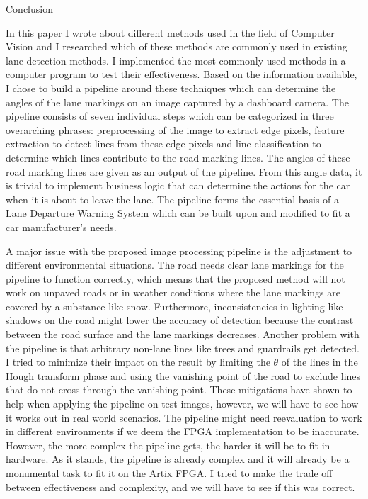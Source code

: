 \documentclass{matthijs}
\begin{document}
	\begin{hoofdstuk}{Conclusion}

		In this paper I wrote about different methods used in the field of Computer Vision and I researched which of these methods are commonly used in existing lane detection methods.
		I implemented the most commonly used methods in a computer program to test their effectiveness.
		Based on the information available, I chose to build a pipeline around these techniques which can determine the angles of the lane markings on an image captured by a dashboard camera.
		The pipeline consists of seven individual steps which can be categorized in three overarching phrases: preprocessing of the image to extract edge pixels, feature extraction to detect lines from these edge pixels and line classification to determine which lines contribute to the road marking lines.
		The angles of these road marking lines are given as an output of the pipeline.
		From this angle data, it is trivial to implement business logic that can determine the actions for the car when it is about to leave the lane.
		The pipeline forms the essential basis of a Lane Departure Warning System which can be built upon and modified to fit a car manufacturer's needs.

		\bigskip

		A major issue with the proposed image processing pipeline is the adjustment to different environmental situations.
		The road needs clear lane markings for the pipeline to function correctly, which means that the proposed method will not work on unpaved roads or in weather conditions where the lane markings are covered by a substance like snow.
		Furthermore, inconsistencies in lighting like shadows on the road might lower the accuracy of detection because the contrast between the road surface and the lane markings decreases.
		Another problem with the pipeline is that arbitrary non-lane lines like trees and guardrails get detected.
		I tried to minimize their impact on the result by limiting the $\theta$ of the lines in the Hough transform phase and using the vanishing point of the road to exclude lines that do not cross through the vanishing point.
		These mitigations have shown to help when applying the pipeline on test images, however, we will have to see how it works out in real world scenarios.
		The pipeline might need reevaluation to work in different environments if we deem the FPGA implementation to be inaccurate.
		However, the more complex the pipeline gets, the harder it will be to fit in hardware.
		As it stands, the pipeline is already complex and it will already be a monumental task to fit it on the Artix FPGA.
		I tried to make the trade off between effectiveness and complexity, and we will have to see if this was correct.

	\end{hoofdstuk}
\end{document}
